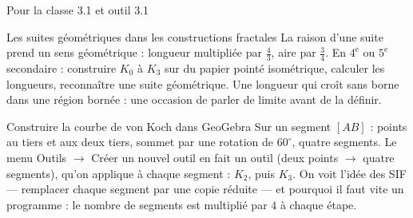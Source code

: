 \begin{frame}{Pour la classe 3.1 et outil 3.1}
  \begin{Classe}{Les suites géométriques dans les constructions fractales}
    \footnotesize La raison d'une suite prend un sens géométrique :
    longueur multipliée par $\tfrac43$, aire par $\tfrac34$. En
    $4^{\text{e}}$ ou $5^{\text{e}}$ secondaire : construire $K_0$ à $K_3$
    sur du papier pointé isométrique, calculer les longueurs, reconnaître
    une suite géométrique. Une longueur qui croît sans borne dans une
    région bornée : une occasion de parler de limite avant de la définir.
  \end{Classe}
  \begin{Outil}{Construire la courbe de von Koch dans GeoGebra}
    \footnotesize Sur un segment $[AB]$ : points au tiers et aux deux
    tiers, sommet par une rotation de $60^\circ$, quatre segments. Le menu
    Outils $\to$ Créer un nouvel outil en fait un outil (deux points
    $\to$ quatre segments), qu'on applique à chaque segment : $K_2$, puis
    $K_3$. On voit l'idée des SIF --- remplacer chaque segment par une
    copie réduite --- et pourquoi il faut vite un programme : le nombre
    de segments est multiplié par $4$ à chaque étape.
  \end{Outil}
\end{frame}
